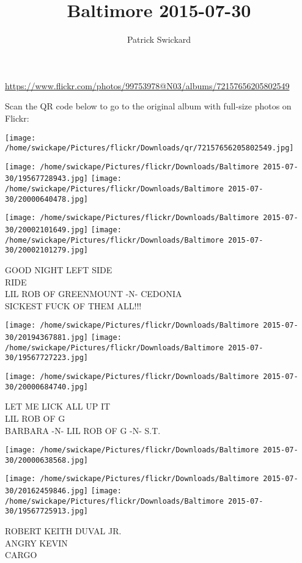 \documentclass[10pt,letterpaper]{article}
\title{Baltimore 2015-07-30}
\author{Patrick Swickard}
\date{}
\begin{document}
\maketitle

\url{https://www.flickr.com/photos/99753978@N03/albums/72157656205802549}

Scan the QR code below to go to the original album with full-size photos on Flickr:

\texttt{[image: /home/swickape/Pictures/flickr/Downloads/qr/72157656205802549.jpg]}
\pagebreak

\texttt{[image: /home/swickape/Pictures/flickr/Downloads/Baltimore 2015-07-30/19567728943.jpg]}
\texttt{[image: /home/swickape/Pictures/flickr/Downloads/Baltimore 2015-07-30/20000640478.jpg]}

\texttt{[image: /home/swickape/Pictures/flickr/Downloads/Baltimore 2015-07-30/20002101649.jpg]}
\texttt{[image: /home/swickape/Pictures/flickr/Downloads/Baltimore 2015-07-30/20002101279.jpg]}

GOOD NIGHT LEFT SIDE\\
RIDE\\
LIL ROB OF GREENMOUNT {-}N{-} CEDONIA\\
SICKEST FUCK OF THEM ALL!!!
\pagebreak

\texttt{[image: /home/swickape/Pictures/flickr/Downloads/Baltimore 2015-07-30/20194367881.jpg]}
\texttt{[image: /home/swickape/Pictures/flickr/Downloads/Baltimore 2015-07-30/19567727223.jpg]}

\texttt{[image: /home/swickape/Pictures/flickr/Downloads/Baltimore 2015-07-30/20000684740.jpg]}

LET ME LICK ALL UP IT\\
LIL ROB OF G\\
BARBARA {-}N{-} LIL ROB OF G {-}N{-} S.T.
\pagebreak

\texttt{[image: /home/swickape/Pictures/flickr/Downloads/Baltimore 2015-07-30/20000638568.jpg]}

\vspace{0.25in}
\texttt{[image: /home/swickape/Pictures/flickr/Downloads/Baltimore 2015-07-30/20162459846.jpg]}
\texttt{[image: /home/swickape/Pictures/flickr/Downloads/Baltimore 2015-07-30/19567725913.jpg]}

ROBERT KEITH DUVAL JR.\\
ANGRY KEVIN\\
CARGO
\pagebreak
\end{document}
